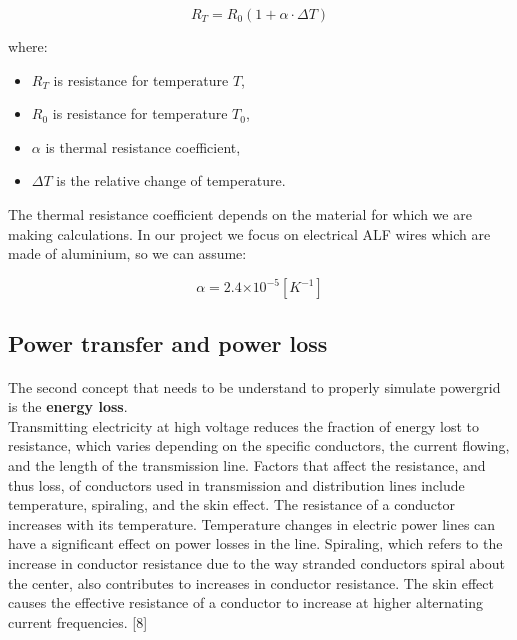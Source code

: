 \documentclass[a4paper]{article}
\providecommand{\e}[1]{\ensuremath{\times 10^{#1}}}
\begin{document}
\begin{equation}
R_T=R_0(1+\alpha \cdot \Delta T)
\end{equation}

where:
\begin{itemize}
	\setlength{\itemsep}{1pt}
	\setlength{\parskip}{0pt}
	\setlength{\parsep}{0pt}
\item $R_T$ is resistance for temperature $T$,
\item $R_0$ is resistance for temperature $T_0$,
\item $\alpha$ is thermal resistance coefficient,
\item $\Delta T$ is the relative change of temperature.\\
\end{itemize}

The thermal resistance coefficient depends on the material for which we are making calculations. In our project we focus on electrical ALF wires which are made of aluminium, so we can assume:

\begin{equation}
\alpha = 2.4\e{-5} [K^{-1}]
\end{equation}

\subsection{Power transfer and power loss}
\label{sec:powerTransferAndPowerLoss}
\paragraph{}
The second concept that needs to be understand to properly simulate powergrid is the \textbf{energy loss}.\\ 

Transmitting electricity at high voltage reduces the fraction of energy lost to resistance, which varies depending on the specific conductors, the current flowing, and the length of the transmission line. Factors that affect the resistance, and thus loss, of conductors used in transmission and distribution lines include temperature, spiraling, and the skin effect. The resistance of a conductor increases with its temperature. Temperature changes in electric power lines can have a significant effect on power losses in the line. Spiraling, which refers to the increase in conductor resistance due to the way stranded conductors spiral about the center, also contributes to increases in conductor resistance. The skin effect causes the effective resistance of a conductor to increase at higher alternating current frequencies. [8]\\
\end{document}
